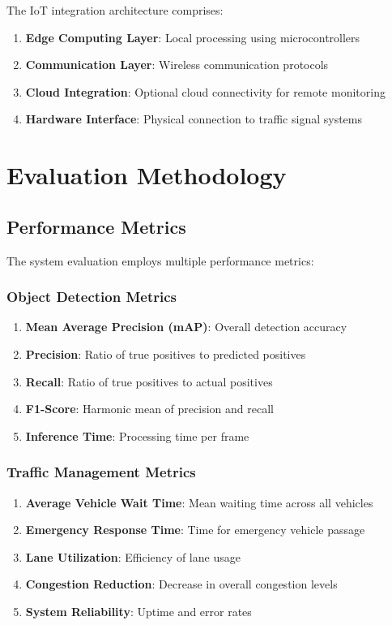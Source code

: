 The IoT integration architecture comprises:

\begin{enumerate}
    \item \textbf{Edge Computing Layer}: Local processing using microcontrollers
    \item \textbf{Communication Layer}: Wireless communication protocols
    \item \textbf{Cloud Integration}: Optional cloud connectivity for remote monitoring
    \item \textbf{Hardware Interface}: Physical connection to traffic signal systems
\end{enumerate}

\section{Evaluation Methodology}

\subsection{Performance Metrics}

The system evaluation employs multiple performance metrics:

\subsubsection{Object Detection Metrics}

\begin{enumerate}
    \item \textbf{Mean Average Precision (mAP)}: Overall detection accuracy
    \item \textbf{Precision}: Ratio of true positives to predicted positives
    \item \textbf{Recall}: Ratio of true positives to actual positives
    \item \textbf{F1-Score}: Harmonic mean of precision and recall
    \item \textbf{Inference Time}: Processing time per frame
\end{enumerate}

\subsubsection{Traffic Management Metrics}

\begin{enumerate}
    \item \textbf{Average Vehicle Wait Time}: Mean waiting time across all vehicles
    \item \textbf{Emergency Response Time}: Time for emergency vehicle passage
    \item \textbf{Lane Utilization}: Efficiency of lane usage
    \item \textbf{Congestion Reduction}: Decrease in overall congestion levels
    \item \textbf{System Reliability}: Uptime and error rates
\end{enumerate}

